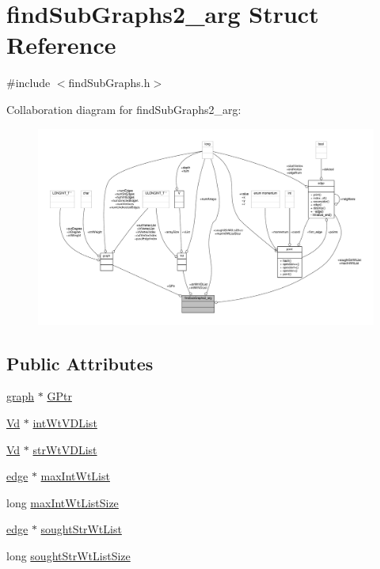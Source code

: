 \hypertarget{structfindSubGraphs2__arg}{\section{find\-Sub\-Graphs2\-\_\-arg Struct Reference}
\label{structfindSubGraphs2__arg}
}


{\ttfamily \#include $<$find\-Sub\-Graphs.\-h$>$}



Collaboration diagram for find\-Sub\-Graphs2\-\_\-arg\-:
\nopagebreak
\begin{figure}[H]
\begin{center}
\leavevmode
\includegraphics[width=350pt]{structfindSubGraphs2__arg__coll__graph}
\end{center}
\end{figure}
\subsection*{Public Attributes}
\begin{DoxyCompactItemize}
\item 
\hyperlink{structgraph}{graph} $\ast$ \hyperlink{structfindSubGraphs2__arg_a97ece730ab346b00630d908893adfd49}{G\-Ptr}
\item 
\hyperlink{structVd}{Vd} $\ast$ \hyperlink{structfindSubGraphs2__arg_abf4da06601207c9c6c89dbd383100e13}{int\-Wt\-V\-D\-List}
\item 
\hyperlink{structVd}{Vd} $\ast$ \hyperlink{structfindSubGraphs2__arg_a54e774d6935443c731276a1e5a8540eb}{str\-Wt\-V\-D\-List}
\item 
\hyperlink{classedge}{edge} $\ast$ \hyperlink{structfindSubGraphs2__arg_a890346168a3f76cbeebb027241bf1195}{max\-Int\-Wt\-List}
\item 
long \hyperlink{structfindSubGraphs2__arg_ae901a74c140e9ea70cd88a8954708d2e}{max\-Int\-Wt\-List\-Size}
\item 
\hyperlink{classedge}{edge} $\ast$ \hyperlink{structfindSubGraphs2__arg_ab5b6e2a5ff9ab69ffe70d99da7877080}{sought\-Str\-Wt\-List}
\item 
long \hyperlink{structfindSubGraphs2__arg_a8b7068c1955dd64970ff6234cce5363a}{sought\-Str\-Wt\-List\-Size}
\end{DoxyCompactItemize}


